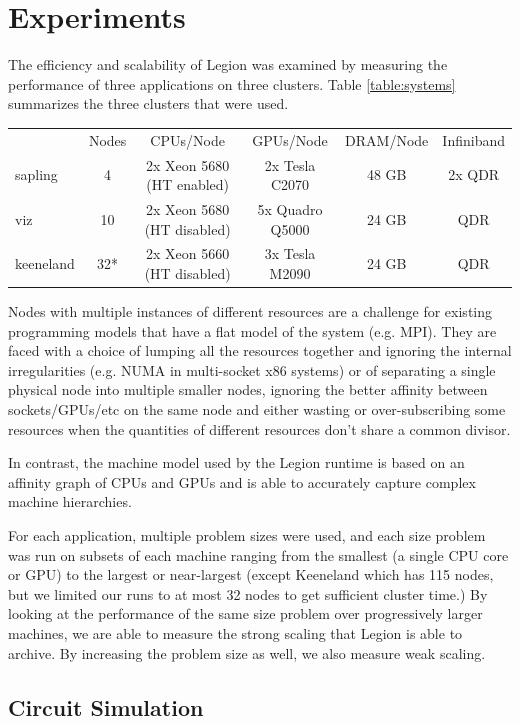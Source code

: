 \section{Experiments}
\label{sec:exp}

The efficiency and scalability of Legion was examined by measuring the performance
of three applications on three clusters.  Table \ref{table:systems} summarizes 
the three clusters that were used.

\begin{tabular}{lccccc}
 & Nodes & CPUs/Node & GPUs/Node & DRAM/Node & Infiniband \\
sapling & 4 & 2x Xeon 5680 (HT enabled) & 2x Tesla C2070 & 48 GB & 2x QDR \\
viz & 10 & 2x Xeon 5680 (HT disabled) & 5x Quadro Q5000 & 24 GB & QDR \\
keeneland & 32* & 2x Xeon 5660 (HT disabled) & 3x Tesla M2090 & 24 GB & QDR 
\end{tabular}

Nodes with multiple instances of different resources are a challenge for 
existing programming models that have a flat model of the system (e.g. MPI).
They are faced with a choice of lumping all 
the resources together and ignoring the internal irregularities (e.g. NUMA
in multi-socket x86 systems) or of separating a single physical node into
multiple smaller nodes, ignoring the better affinity between sockets/GPUs/etc
on the same node and either wasting or over-subscribing some resources when
the quantities of different resources don't share a common divisor.

In contrast, the machine model used by the Legion runtime is based on an
affinity graph of CPUs and GPUs and is able to accurately capture complex
machine hierarchies.

For each application, multiple problem sizes were used, and each size problem was
run on subsets of each machine ranging from the smallest (a single CPU core or GPU)
to the largest or near-largest (except Keeneland which has 115 nodes, but we limited 
our runs to at most 32 nodes to get sufficient cluster time.)
By looking at the performance of the same size problem over progressively larger
machines, we are able to measure the strong scaling that Legion is able to
archive.  By increasing the problem size as well, we also measure weak scaling.

\subsection{Circuit Simulation}
\label{subsec:exp_ckt}

